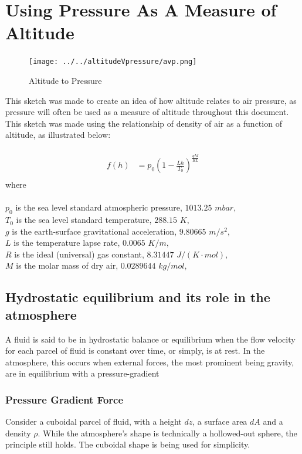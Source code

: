 \documentclass[hidelinks]{article}
\begin{document}
\newpage
\section{Using Pressure As A Measure of Altitude}
\label{sec:measure}
\begin{figure}[h!]
	\centering
	\texttt{[image: ../../altitudeVpressure/avp.png]}
	\caption{Altitude to Pressure}
\end{figure}
\noindent
This sketch was made to create an idea of how altitude relates to air pressure, as pressure will often be used as a measure of altitude throughout this document. This sketch was made using the relationship of density of air as a function of altitude, as illustrated below:
\\\\
\begin{align*}
	f(h) &= p_0\left(1- \frac{Lh}{T_0}\right)^{\frac{gM}{RL}} \\
\end{align*}
where \\\\$p_{0}$ is the sea level standard atmospheric pressure, $1013.25$ $mbar,$ \\
$T_{0}$ is the sea level standard temperature, $288.15$ $K,$ \\
$g$ is the earth-surface gravitational acceleration, $9.80665$ $m/s^{2},$\\
$L$ is the temperature lapse rate, $0.0065$ $K/m,$\\
$R$ is the ideal (universal) gas constant, $8.31447$ $J/(K\cdot mol),$\\
$M$ is the molar mass of dry air, $0.0289644$ $kg/mol,$\\

\subsection{Hydrostatic equilibrium and its role in the atmosphere}
A fluid is said to be in hydrostatic balance or equilibrium when the flow velocity for each parcel of fluid is constant over time, or simply, is at rest. \cite{hydrostatic_equilibrium} In the atmosphere, this occurs when external forces, the most prominent being gravity, are in equilibrium with a pressure-gradient
 \newpage
\subsubsection{Pressure Gradient Force}
Consider a cuboidal parcel of fluid, with a height $dz$, a surface area $dA$ and a density $\rho$. While the atmosphere's shape is technically a hollowed-out sphere, the principle still holds. The cuboidal shape is being used for simplicity.
\end{document}
